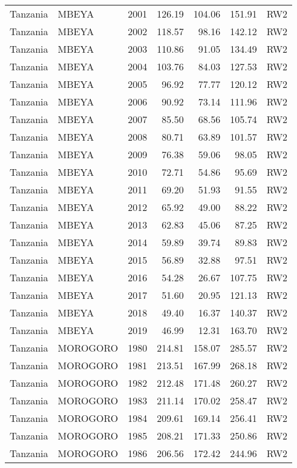 \begin{longtable}{lllrrrl}
  Tanzania & MBEYA & 2001 & 126.19 & 104.06 & 151.91 & RW2 \\ 
  Tanzania & MBEYA & 2002 & 118.57 & 98.16 & 142.12 & RW2 \\ 
  Tanzania & MBEYA & 2003 & 110.86 & 91.05 & 134.49 & RW2 \\ 
  Tanzania & MBEYA & 2004 & 103.76 & 84.03 & 127.53 & RW2 \\ 
  Tanzania & MBEYA & 2005 & 96.92 & 77.77 & 120.12 & RW2 \\ 
  Tanzania & MBEYA & 2006 & 90.92 & 73.14 & 111.96 & RW2 \\ 
  Tanzania & MBEYA & 2007 & 85.50 & 68.56 & 105.74 & RW2 \\ 
  Tanzania & MBEYA & 2008 & 80.71 & 63.89 & 101.57 & RW2 \\ 
  Tanzania & MBEYA & 2009 & 76.38 & 59.06 & 98.05 & RW2 \\ 
  Tanzania & MBEYA & 2010 & 72.71 & 54.86 & 95.69 & RW2 \\ 
  Tanzania & MBEYA & 2011 & 69.20 & 51.93 & 91.55 & RW2 \\ 
  Tanzania & MBEYA & 2012 & 65.92 & 49.00 & 88.22 & RW2 \\ 
  Tanzania & MBEYA & 2013 & 62.83 & 45.06 & 87.25 & RW2 \\ 
  Tanzania & MBEYA & 2014 & 59.89 & 39.74 & 89.83 & RW2 \\ 
  Tanzania & MBEYA & 2015 & 56.89 & 32.88 & 97.51 & RW2 \\ 
  Tanzania & MBEYA & 2016 & 54.28 & 26.67 & 107.75 & RW2 \\ 
  Tanzania & MBEYA & 2017 & 51.60 & 20.95 & 121.13 & RW2 \\ 
  Tanzania & MBEYA & 2018 & 49.40 & 16.37 & 140.37 & RW2 \\ 
  Tanzania & MBEYA & 2019 & 46.99 & 12.31 & 163.70 & RW2 \\ 
  Tanzania & MOROGORO & 1980 & 214.81 & 158.07 & 285.57 & RW2 \\ 
  Tanzania & MOROGORO & 1981 & 213.51 & 167.99 & 268.18 & RW2 \\ 
  Tanzania & MOROGORO & 1982 & 212.48 & 171.48 & 260.27 & RW2 \\ 
  Tanzania & MOROGORO & 1983 & 211.14 & 170.02 & 258.47 & RW2 \\ 
  Tanzania & MOROGORO & 1984 & 209.61 & 169.14 & 256.41 & RW2 \\ 
  Tanzania & MOROGORO & 1985 & 208.21 & 171.33 & 250.86 & RW2 \\ 
  Tanzania & MOROGORO & 1986 & 206.56 & 172.42 & 244.96 & RW2 \\ 

\end{longtable}

